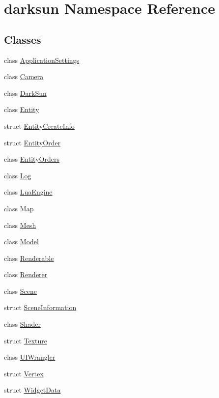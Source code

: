 \hypertarget{namespacedarksun}{}\section{darksun Namespace Reference}
\label{namespacedarksun}
\subsection*{Classes}
\begin{DoxyCompactItemize}
\item 
class \mbox{\hyperlink{classdarksun_1_1_application_settings}{Application\+Settings}}
\item 
class \mbox{\hyperlink{classdarksun_1_1_camera}{Camera}}
\item 
class \mbox{\hyperlink{classdarksun_1_1_dark_sun}{Dark\+Sun}}
\item 
class \mbox{\hyperlink{classdarksun_1_1_entity}{Entity}}
\item 
struct \mbox{\hyperlink{structdarksun_1_1_entity_create_info}{Entity\+Create\+Info}}
\item 
struct \mbox{\hyperlink{structdarksun_1_1_entity_order}{Entity\+Order}}
\item 
class \mbox{\hyperlink{classdarksun_1_1_entity_orders}{Entity\+Orders}}
\item 
class \mbox{\hyperlink{classdarksun_1_1_log}{Log}}
\item 
class \mbox{\hyperlink{classdarksun_1_1_lua_engine}{Lua\+Engine}}
\item 
class \mbox{\hyperlink{classdarksun_1_1_map}{Map}}
\item 
class \mbox{\hyperlink{classdarksun_1_1_mesh}{Mesh}}
\item 
class \mbox{\hyperlink{classdarksun_1_1_model}{Model}}
\item 
class \mbox{\hyperlink{classdarksun_1_1_renderable}{Renderable}}
\item 
class \mbox{\hyperlink{classdarksun_1_1_renderer}{Renderer}}
\item 
class \mbox{\hyperlink{classdarksun_1_1_scene}{Scene}}
\item 
struct \mbox{\hyperlink{structdarksun_1_1_scene_information}{Scene\+Information}}
\item 
class \mbox{\hyperlink{classdarksun_1_1_shader}{Shader}}
\item 
struct \mbox{\hyperlink{structdarksun_1_1_texture}{Texture}}
\item 
class \mbox{\hyperlink{classdarksun_1_1_u_i_wrangler}{U\+I\+Wrangler}}
\item 
struct \mbox{\hyperlink{structdarksun_1_1_vertex}{Vertex}}
\item 
struct \mbox{\hyperlink{structdarksun_1_1_widget_data}{Widget\+Data}}
\end{DoxyCompactItemize}
